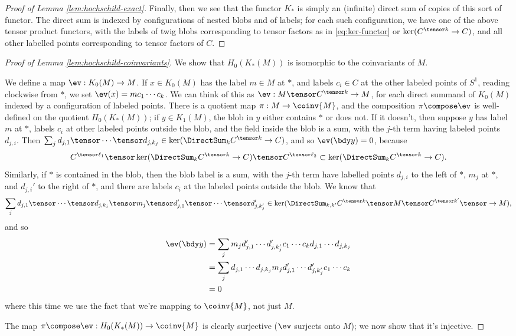 \begin{proof}[Proof of Lemma \ref{lem:hochschild-exact}]
Finally, then we see that the functor $K_*$ is simply an (infinite)
direct sum of copies of this sort of functor. The direct sum is indexed by
configurations of nested blobs and of labels; for each such configuration, we have one of the above tensor product functors,
with the labels of twig blobs corresponding to tensor factors as in \eqref{eq:ker-functor} or $\ker(C^{\tensor k} \to C)$, and all other labelled points corresponding
to tensor factors of $C$.
\end{proof}
\begin{proof}[Proof of Lemma \ref{lem:hochschild-coinvariants}]
We show that $H_0(K_*(M))$ is isomorphic to the coinvariants of $M$.

We define a map $\ev: K_0(M) \to M$. If $x \in K_0(M)$ has the label $m \in M$ at $*$, and labels $c_i \in C$ at the other labeled points of $S^1$, reading clockwise from $*$,
we set $\ev(x) = m c_1 \cdots c_k$. We can think of this as $\ev : M \tensor C^{\tensor k} \to M$, for each direct summand of $K_0(M)$ indexed by a configuration of labeled points.
There is a quotient map $\pi: M \to \coinv{M}$, and the composition $\pi \compose \ev$ is well-defined on the quotient $H_0(K_*(M))$; if $y \in K_1(M)$, the blob in $y$ either contains $*$ or does not. If it doesn't, then
suppose $y$ has label $m$ at $*$, labels $c_i$ at other labeled points outside the blob, and the field inside the blob is a sum, with the $j$-th term having
labeled points $d_{j,i}$. Then $\sum_j d_{j,1} \tensor \cdots \tensor d_{j,k_j} \in \ker(\DirectSum_k C^{\tensor k} \to C)$, and so
$\ev(\bdy y) = 0$, because $$C^{\tensor \ell_1} \tensor \ker(\DirectSum_k C^{\tensor k} \to C) \tensor C^{\tensor \ell_2} \subset \ker(\DirectSum_k C^{\tensor k} \to C).$$
Similarly, if $*$ is contained in the blob, then the blob label is a sum, with the $j$-th term have labelled points $d_{j,i}$ to the left of $*$, $m_j$ at $*$, and $d_{j,i}'$ to the right of $*$,
and there are labels $c_i$ at the labeled points outside the blob. We know that
$$\sum_j d_{j,1} \tensor \cdots \tensor d_{j,k_j} \tensor m_j \tensor d_{j,1}' \tensor \cdots \tensor d_{j,k'_j}' \in \ker(\DirectSum_{k,k'} C^{\tensor k} \tensor M \tensor C^{\tensor k'} \tensor \to M),$$
and so
\begin{align*}
\ev(\bdy y) & = \sum_j m_j d_{j,1}' \cdots d_{j,k'_j}' c_1 \cdots c_k d_{j,1} \cdots d_{j,k_j} \\
            & = \sum_j d_{j,1} \cdots d_{j,k_j} m_j d_{j,1}' \cdots d_{j,k'_j}' c_1 \cdots c_k \\
            & = 0
\end{align*}
where this time we use the fact that we're mapping to $\coinv{M}$, not just $M$.

The map $\pi \compose \ev: H_0(K_*(M)) \to \coinv{M}$ is clearly surjective ($\ev$ surjects onto $M$); we now show that it's injective. \todo{}
\end{proof}
